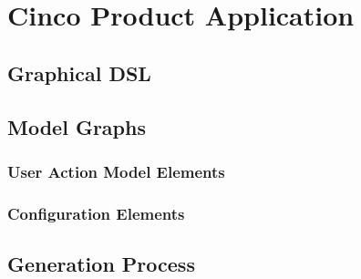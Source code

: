 \chapter{Cinco Product Application}\label{ch:CP}
    \section{Graphical DSL}\label{sec:gDSL}
    \section{Model Graphs}\label{sec:ModElem}
        \subsection{User Action Model Elements}\label{sec:FuncElem}
        \subsection{Configuration Elements}\label{sec:ConfElem}
    \section{Generation Process}